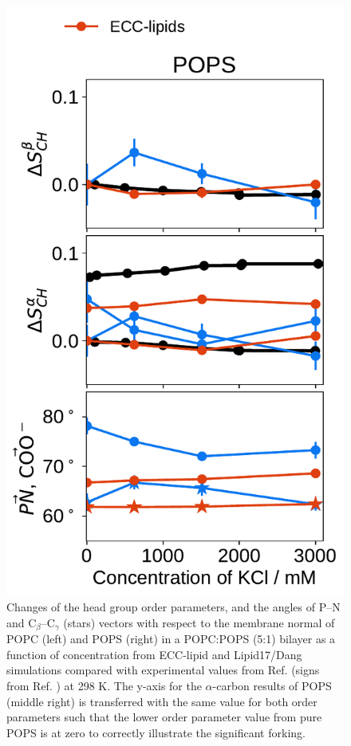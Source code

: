 \documentclass[journal=jpcbfk,manuscript=article]{achemso}
\newlength{\figheight}
\begin{document}
\begin{figure}[tbp!]
  \includegraphics[height=\figheight]{../img/ecc_pops/order_parameters_changes_ecc-lip_L14_A-B-PN-COO_POPS_kcl.pdf} 
  \caption{\label{fig:delta_ordPar_KCl_PCPS}
    Changes of the head group order parameters, and the angles of P--N and C$_\beta$--C$_\gamma$ (stars) vectors 
    with respect to the membrane normal of POPC (left) and POPS (right) in a POPC:POPS (5:1) bilayer 
    as a function of  concentration from ECC-lipid and Lipid17/Dang simulations 
    compared with experimental values from Ref.  (signs from Ref. ) at 298 K.
    The y-axis for the $\alpha$-carbon results of POPS (middle right) is transferred
    with the same value for both order parameters such that the lower order
    parameter value from pure POPS is at zero to correctly illustrate the significant forking.
  }
\end{figure} 
 
\end{document}
